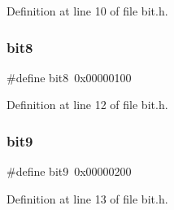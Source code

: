 Definition at line 10 of file bit.\+h.

\mbox{\label{bit_8h_ab6a7679b564d73aec170fd62352852a9}} 
\subsubsection{bit8}
{\footnotesize\ttfamily \#define bit8~0x00000100}



Definition at line 12 of file bit.\+h.

\mbox{\label{bit_8h_a271252bcbfe2a77ed8b3b7328a8839aa}} 
\subsubsection{bit9}
{\footnotesize\ttfamily \#define bit9~0x00000200}



Definition at line 13 of file bit.\+h.

